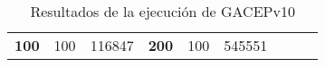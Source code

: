 \begin{table}[H]
\begin{tabular}{|ccrccrccc}
\multicolumn{1}{|c|}{\multirow{-39}{*}{\cellcolor[HTML]{FFFFC7}\textbf{100}}} & \multicolumn{1}{c|}{\multirow{-9}{*}{\cellcolor[HTML]{DDFDFF}100}} & \multicolumn{1}{r|}{\cellcolor[HTML]{DAE8FC}116847}    & \multicolumn{1}{c|}{\multirow{-39}{*}{\cellcolor[HTML]{FFFFC7}\textbf{200}}} & \multicolumn{1}{c|}{\multirow{-10}{*}{\cellcolor[HTML]{DDFDFF}100}} & \multicolumn{1}{r|}{\cellcolor[HTML]{DDFDFF}545551}    &                                                                              &                                                                    &                                                        \\ \cline{1-6}
\end{tabular}
\caption{\label{res:GACEPv10}Resultados de la ejecución de GACEPv10}
\end{table}

